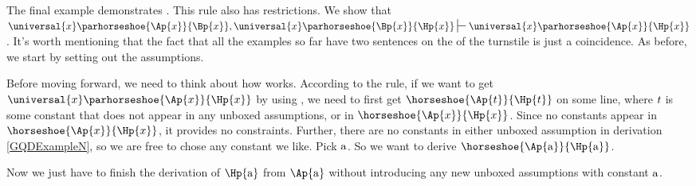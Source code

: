 The final example demonstrates . 
This rule also has restrictions. 
We show that $\universal{\variable{x}}\parhorseshoe{\Ap{\variable{x}}}{\Bp{\variable{x}}},\universal{\variable{x}}\parhorseshoe{\Bp{\variable{x}}}{\Hp{\variable{x}}}\sststile{}{}\universal{\variable{x}}\parhorseshoe{\Ap{\variable{x}}}{\Hp{\variable{x}}}$.
It's worth mentioning that the fact that all the examples so far have two sentences on the  of the turnstile is just a coincidence.
As before, we start by setting out the assumptions.
\begin{gproof}[\label{GQDExampleN}]
\end{gproof}
Before moving forward, we need to think about how  works. 
According to the rule, if we want to get $\universal{\variable{x}}\parhorseshoe{\Ap{\variable{x}}}{\Hp{\variable{x}}}$ by using , we need to first get $\horseshoe{\Ap{\variable{t}}}{\Hp{\variable{t}}}$ on some line, where $t$ is some constant that does not appear in any unboxed assumptions, or in $\horseshoe{\Ap{\variable{x}}}{\Hp{\variable{x}}}$.
Since no constants appear in $\horseshoe{\Ap{\variable{x}}}{\Hp{\variable{x}}}$, it provides no constraints. 
Further, there are no constants in either unboxed assumption in derivation \ref{GQDExampleN}, so we are free to chose any constant we like. 
Pick $\mathrm{a}$. 
So we want to derive $\horseshoe{\Ap{\constant{a}}}{\Hp{\constant{a}}}$.
\begin{gproof}[\label{GQDExampleO}]
\end{gproof}
Now we just have to finish the derivation of $\Hp{\constant{a}}$ from $\Ap{\constant{a}}$ without introducing any new unboxed assumptions with constant $\mathrm{a}$. 
